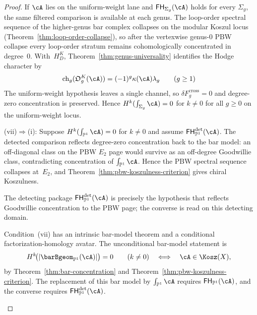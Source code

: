 \begin{proof}
If $\cA$ lies on the uniform-weight lane and
$\mathsf{FH}_{\Sigma_g}(\cA)$ holds for every $\Sigma_g$, the same
filtered comparison is available at each genus. The loop-order
spectral sequence of the higher-genus bar complex collapses on the
modular Koszul locus
(Theorem~\ref{thm:loop-order-collapse}), so after the vertexwise
genus-$0$ PBW collapse every loop-order stratum remains
cohomologically concentrated in degree~$0$.  With~$H_D^K$,
Theorem~\ref{thm:genus-universality} identifies the Hodge character by
\[
\operatorname{ch}_g(\mathfrak O_g^K(\cA))
=(-1)^g\kappa(\cA)\lambda_g
\qquad (g \geq 1)
\]
The uniform-weight hypothesis leaves a single channel, so
$\delta F_g^{\mathrm{cross}}=0$ and degree-zero concentration is
preserved. Hence
$H^k(\int_{\Sigma_g}\cA)=0$ for $k \neq 0$ for all $g \geq 0$ on
the uniform-weight locus.

\smallskip\noindent
\textup{(vii)}$\Rightarrow$\textup{(i)}:
Suppose $H^k(\int_{\mathbb{P}^1}\cA) = 0$ for $k \neq 0$ and assume
$\mathsf{FH}^{\mathrm{det}}_{\mathbb{P}^1}(\cA)$. The detected
comparison reflects degree-zero concentration back to the bar model:
an off-diagonal class on the PBW $E_2$ page would survive as an
off-degree Goodwillie class, contradicting concentration of
$\int_{\mathbb{P}^1}\cA$. Hence the PBW spectral sequence collapses
at~$E_2$, and Theorem~\ref{thm:pbw-koszulness-criterion} gives
chiral Koszulness.

The detecting package
$\mathsf{FH}^{\mathrm{det}}_{\mathbb{P}^1}(\cA)$ is precisely the
hypothesis that reflects Goodwillie concentration to the PBW page;
the converse is read on this detecting domain.

\begin{remark}
\label{rem:fh-vii-uniform-weight-scope}
Condition~\textup{(vii)} has an intrinsic bar-model theorem and a
conditional factorization-homology avatar. The unconditional
bar-model statement is
\[
H^k\!\bigl(|\barBgeom_{\mathbb{P}^1}(\cA)|\bigr)=0
\qquad (k \neq 0)
\quad\Longleftrightarrow\quad
\cA\in\Kosz(X),
\]
by Theorem~\ref{thm:bar-concentration} and
Theorem~\ref{thm:pbw-koszulness-criterion}. The replacement of this
bar model by $\int_{\mathbb{P}^1}\cA$ requires
$\mathsf{FH}_{\mathbb{P}^1}(\cA)$, and the converse requires
$\mathsf{FH}^{\mathrm{det}}_{\mathbb{P}^1}(\cA)$.


\end{remark}
\end{proof}
